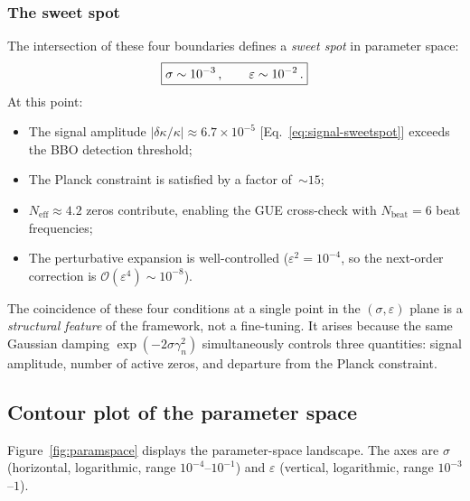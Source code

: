 \documentclass[12pt,a4paper]{article}
\begin{document}
\subsubsection{The sweet spot}

The intersection of these four boundaries defines a
\emph{sweet spot} in parameter space:
\begin{equation}\label{eq:sweetspot}
  \boxed{%
    \sigma \sim 10^{-3}\,,
    \qquad
    \varepsilon \sim 10^{-2}\,.
  }
\end{equation}
At this point:
\begin{itemize}
\item The signal amplitude
  $|\delta\kappa/\kappa|\approx 6.7\times 10^{-5}$
  [Eq.~\eqref{eq:signal-sweetspot}] exceeds the
  BBO detection threshold;
\item The Planck constraint is satisfied by a
  factor of~$\sim\!15$;
\item $N_{\mathrm{eff}}\approx 4.2$ zeros contribute,
  enabling the GUE cross-check with
  $N_{\mathrm{beat}} = 6$ beat frequencies;
\item The perturbative expansion is well-controlled
  ($\varepsilon^2 = 10^{-4}$, so the
  next-order correction is $\mathcal{O}(\varepsilon^4)
  \sim 10^{-8}$).
\end{itemize}
The coincidence of these four conditions at a single
point in the $(\sigma,\varepsilon)$ plane is a
\emph{structural feature} of the framework,
not a fine-tuning.  It arises because the same Gaussian
damping $\exp(-2\sigma\gamma_n^2)$ simultaneously
controls three quantities: signal amplitude, number of
active zeros, and departure from the Planck constraint.


\subsection{Contour plot of the parameter space}
\label{sec:contour}

Figure~\ref{fig:paramspace} displays the parameter-space
landscape.  The axes are $\sigma$
(horizontal, logarithmic, range $10^{-4}$--$10^{-1}$)
and $\varepsilon$ (vertical, logarithmic,
range $10^{-3}$--$1$).
\end{document}
